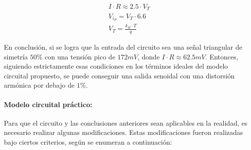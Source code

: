 \begin{align}
    & I \cdot R \approx 2.5 \cdot V_T \\
    & V_{i_{P}} = V_T \cdot 6.6 \\
    & V_T = \frac{k_B \cdot T}{q}
\end{align}


En conclusi\'on, si se logra que la entrada del circuito sea una se\~nal triangular de simetr\'ia $50\%$ con una tensi\'on pico de $172mV$, donde $I \cdot R \approx 62.5mV$. Entonces,
siguiendo estrictamente esas condiciones en los t\'erminos ideales del modelo circuital propuesto, se puede conseguir una salida senoidal con una distorsi\'on arm\'onica por debajo de $1\%$.

\paragraph{Modelo circuital pr\'actico:} Para que el circuito y las conclusiones anteriores sean aplicables en la realidad, es necesario realizar algunas modificaciones. Estas modificaciones
fueron realizadas bajo ciertos criterios, seg\'un se enumeran a continuaci\'on:


